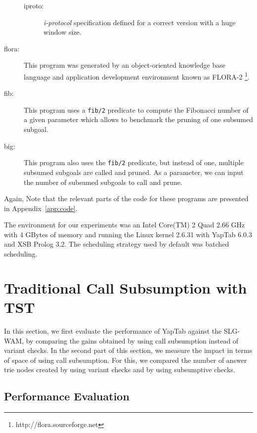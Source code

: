 \begin{description}
\begin{description}
         \item[iproto:] \emph{i-protocol} specification defined for a correct version with a huge window size.

      \end{description}
      
   \item[flora:] This program was generated by an object-oriented knowledge base language and application 
               development environment known as FLORA-2 \cite{Yang-00} \footnote{http://flora.sourceforge.net}.
               
   \item[fib:] This program uses a \texttt{fib/2} predicate to compute the Fibonacci number of a given
   parameter which allows to benchmark the pruning of one subsumed subgoal.
   
   \item[big:] This program also uses the \texttt{fib/2} predicate, but instead of one, multiple subsumed subgoals
   are called and pruned. As a parameter, we can input the number of subsumed subgoals to call and prune.
   
\end{description}

Again, Note that the relevant parts of the code for these programs are presented in Appendix~\ref{app:code}.

The environment for our experiments was an Intel Core(TM) 2 Quad 2.66 GHz with 4 GBytes of
memory and running the Linux kernel 2.6.31 with YapTab 6.0.3 and XSB Prolog 3.2.
The scheduling strategy used by default was batched scheduling.

\section{Traditional Call Subsumption with TST}

In this section, we first evaluate the performance of YapTab against the SLG-WAM,
by comparing the gains obtained by using call subsumption instead of variant checks.
In the second part of this section, we measure the impact in terms of space of using call subsumption.
For this, we compared the number of answer trie nodes created by using variant checks and by using subsumptive
checks.

\subsection{Performance Evaluation}

